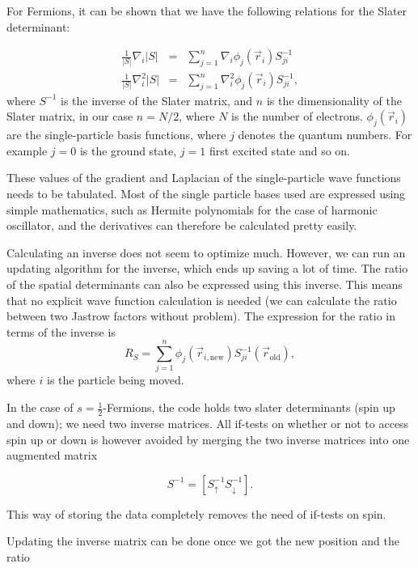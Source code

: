 For Fermions, it can be shown that we have the following relations for the Slater determinant\cite{larseivind}:

\begin{eqnarray}
 \frac{1}{|S|}\nabla_i |S| &=& \displaystyle\sum_{j=1}^n \nabla_i \phi_j(\vec r_i)S^{-1}_{ji} \\ 
\frac{1}{|S|}\nabla^2_i |S| &=& \displaystyle\sum_{j=1}^n \nabla^2_i \phi_j(\vec r_i)S^{-1}_{ji},\nonumber
\label{eq:grad_lapl_S}
\end{eqnarray}
where $S^{-1}$ is the inverse of the Slater matrix, and $n$ is the dimensionality of the Slater matrix, in our case $n=N/2$, where $N$ is the number of electrons. $\phi_j(\vec r_i)$ are the single-particle basis functions, where $j$ denotes the quantum numbers. For example $j=0$ is the ground state, $j=1$ first excited state and so on. 

These values of the gradient and Laplacian of the single-particle wave functions needs to be tabulated. Most of the single particle bases used are expressed using simple mathematics, such as Hermite polynomials for the case of harmonic oscillator, and the derivatives can therefore be calculated pretty easily. 

Calculating an inverse does not seem to optimize much. However, we can run an updating algorithm for the inverse, which ends up saving a lot of time. The ratio of the spatial determinants can also be expressed using this inverse\cite{larslarseivind}. This means that no explicit wave function calculation is needed (we can calculate the ratio between two Jastrow factors without problem). The expression for the ratio in terms of the inverse is
\begin{equation}
 R_S = \displaystyle\sum_{j=1}^n \phi_j({\vec r}_{i,\mathrm{new}})S^{-1}_{ji}(\vec r_\mathrm{old}),
\label{eq:Ratio}
\end{equation}
where $i$ is the particle being moved.

In the case of $s=\frac{1}{2}$-Fermions, the code holds two slater determinants (spin up and down); we need two inverse matrices. All if-tests on whether or not to access spin up or down is however avoided by merging the two inverse matrices into one augmented matrix

\[
 S^{-1} = \left[S^{-1}_\uparrow S^{-1}_\downarrow\right].
\]

\noindent
This way of storing the data completely removes the need of if-tests on spin.

Updating the inverse matrix can be done once we got the new position and the ratio

